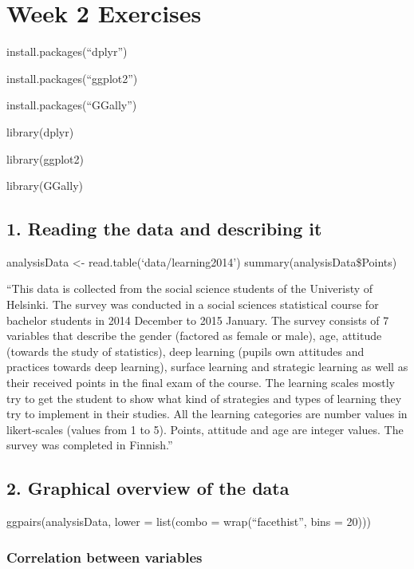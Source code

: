 \documentclass[]{article}
\title{}
\author{}
\date{}
\begin{document}
\hypertarget{week-2-exercises}{%
\section{Week 2 Exercises}\label{week-2-exercises}}

install.packages(``dplyr'')

install.packages(``ggplot2'')

install.packages(``GGally'')

library(dplyr)

library(ggplot2)

library(GGally)

\hypertarget{reading-the-data-and-describing-it}{%
\subsection{1. Reading the data and describing
it}\label{reading-the-data-and-describing-it}}

analysisData \textless{}- read.table(`data/learning2014')
summary(analysisData\$Points)

``This data is collected from the social science students of the
Univeristy of Helsinki. The survey was conducted in a social sciences
statistical course for bachelor students in 2014 December to 2015
January. The survey consists of 7 variables that describe the gender
(factored as female or male), age, attitude (towards the study of
statistics), deep learning (pupils own attitudes and practices towards
deep learning), surface learning and strategic learning as well as their
received points in the final exam of the course. The learning scales
mostly try to get the student to show what kind of strategies and types
of learning they try to implement in their studies. All the learning
categories are number values in likert-scales (values from 1 to 5).
Points, attitude and age are integer values. The survey was completed in
Finnish.''

\hypertarget{graphical-overview-of-the-data}{%
\subsection{2. Graphical overview of the
data}\label{graphical-overview-of-the-data}}

ggpairs(analysisData, lower = list(combo = wrap(``facethist'', bins =
20)))

\hypertarget{correlation-between-variables}{%
\subsubsection{Correlation between
variables}\label{correlation-between-variables}}
\end{document}
